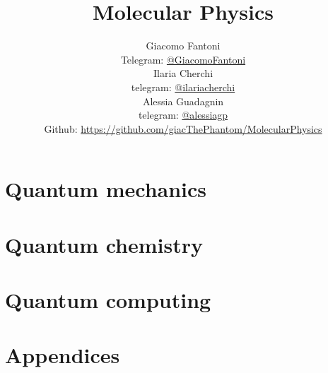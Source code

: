 

\title{\Huge \textbf{Molecular Physics}}

\author{
  Giacomo Fantoni \\
  \small Telegram: \href{https://t.me/GiacomoFantoni}{@GiacomoFantoni} \\[3pt]
  Ilaria Cherchi\\
  \small telegram: \href{https://t.me/ilariacherchi}{@ilariacherchi} \\[3pt]
  Alessia Guadagnin\\
  \small telegram: \href{https://t.me/alessiagp}{@alessiagp} \\[3pt]
\small Github: \href{https://github.com/giacThePhantom/MolecularPhysics}{https://github.com/giacThePhantom/MolecularPhysics}}

\maketitle
\tableofcontents

  \part{Quantum mechanics}

    
    
    
    

  \part{Quantum chemistry}

    
    
    

  \part{Quantum computing}

    

  \part{Appendices}

    
    
    
    
    
    
    



